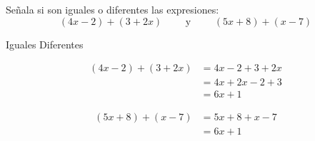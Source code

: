 Señala si son iguales o diferentes las expresiones: \[ (4x-2) + (3+2x) \qquad \text{ y }\qquad (5x+8) + (x-7)\]
\begin{oneparchoices}
    \CorrectChoice Iguales
    \choice Diferentes
\end{oneparchoices}
\begin{solutionbox}{4cm}
    \begin{multicols}{2}
        \begin{align*}
            (4x-2) + (3+2x) & =4x-2+3+2x \\
                            & =4x+2x-2+3 \\
                            & =6x+1
        \end{align*}

        \columnbreak

        \begin{align*}
            (5x+8) + (x-7) & =5x+8+x-7 \\
                           & =6x+1
        \end{align*}
    \end{multicols}
\end{solutionbox}



